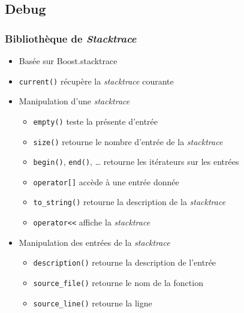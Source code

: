 \documentclass[C++.tex]{subfiles}
\begin{document}
\subsection*{Debug}
\begin{frame}[fragile]
	\frametitle{Bibliothèque de \textit{Stacktrace}}
	\begin{itemize}
		\item Basée sur Boost.stacktrace
		\item \lstinline|current()| récupère la \textit{stacktrace} courante
		\item Manipulation d'une \textit{stacktrace}
		\begin{itemize}
			\item \lstinline|empty()| teste la présente d'entrée
			\item \lstinline|size()| retourne le nombre d'entrée de la \textit{stacktrace}
			\item \lstinline|begin()|, \lstinline|end()|, \ldots{} retourne les itérateurs sur les entrées
			\item \lstinline|operator[]| accède à une entrée donnée
			\item \lstinline|to_string()| retourne la description de la \textit{stacktrace}
			\item \lstinline|operator<<| affiche la \textit{stacktrace}
		\end{itemize}
		\item Manipulation des entrées de la \textit{stacktrace}
		\begin{itemize}
			\item \lstinline|description()| retourne la description de l'entrée
			\item \lstinline|source_file()| retourne le nom de la fonction
			\item \lstinline|source_line()| retourne la ligne
		\end{itemize}
	\end{itemize}
\end{frame}
\end{document}
